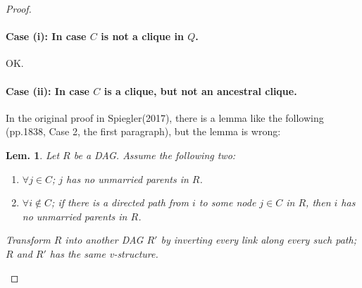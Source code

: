 \documentclass[11pt,a4paper,dvipdfmx]{article}
\theoremstyle{plain}
\newtheorem{lem}{Lem.}[section]
\begin{document}
\begin{proof}
	\paragraph{Case (i): In case $C$ is not a clique in $Q$.}
	OK.
	
	\paragraph{Case (ii): In case $C$ is a clique, but not an ancestral clique.}
	In the original proof in Spiegler(2017), there is a lemma like the following (pp.1838, Case 2, the first paragraph), but the lemma is wrong:
	
	\begin{screen}
	\begin{lem} \label{wrong_lem}
	Let $R$ be a DAG. Assume the following two:
		\begin{enumerate}
			\item $\forall j \in C$; $j$ has no unmarried parents in $R$.
			\item $\forall i \notin C$; if there is a directed path from $i$ to some node $j \in C$ in $R$, then $i$ has no unmarried parents in $R$.
		\end{enumerate}
		Transform $R$ into another DAG $R'$ by inverting every link along every such path; $R$ and $R'$ has the same v-structure.
	\end{lem}
	\end{screen}
	

\end{proof}
\end{document}
